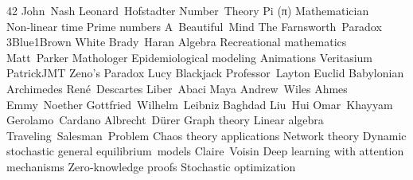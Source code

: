 \answerkey
{} 42
 John Nash
 Leonard Hofstadter
 Number Theory
 Pi (π)
 Mathematician
 Non‑linear time
 Prime numbers
 A Beautiful Mind
 The Farnsworth Paradox
 3Blue1Brown
 White
 Brady Haran
 Algebra
 Recreational mathematics
 Matt Parker
 Mathologer
 Epidemiological modeling
 Animations
 Veritasium
 PatrickJMT
 Zeno's Paradox
 Lucy
 Blackjack
 Professor Layton
 Euclid
 Babylonian
 Archimedes
 René Descartes
 Liber Abaci
 Maya
 Andrew Wiles
 Ahmes
 Emmy Noether
 Gottfried Wilhelm Leibniz
 Baghdad
 Liu Hui
 Omar Khayyam
 Gerolamo Cardano
 Albrecht Dürer
 Graph theory
 Linear algebra
 Traveling Salesman Problem
 Chaos theory applications
 Network theory
 Dynamic stochastic general equilibrium models
 Claire Voisin
 Deep learning with attention mechanisms
 Zero‑knowledge proofs
 Stochastic optimization
\endanswerkey